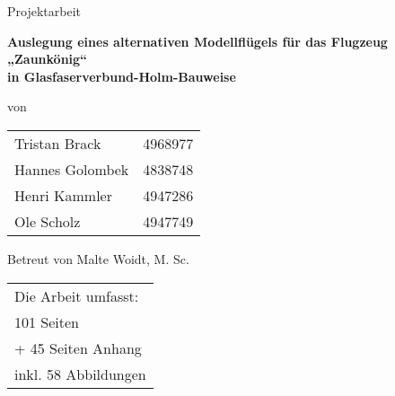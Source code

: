 
\begin{center}

	\par\bigskip
	\par\bigskip
	\par\bigskip
	\par\bigskip	
	\par\bigskip
	\par\bigskip	
	{Projektarbeit}\\
\begin{huge}	\par\bigskip
	\par\bigskip	
	\par\bigskip
	\par\bigskip	
	\textbf{Auslegung eines alternativen Modellflügels für das Flugzeug „Zaunkönig“} \\
	\textbf{in Glasfaserverbund-Holm-Bauweise}\\
	\par\bigskip
	\par\bigskip
	
	\end{huge}

	\par\bigskip
	
\par\bigskip
\par\bigskip	
	\par\bigskip
\par\bigskip
von	
\par\bigskip
\par\bigskip
\begin{tabular}{lr}
	Tristan Brack& 4968977\\
	Hannes Golombek & 4838748\\
	Henri Kammler & 4947286\\
	Ole Scholz & 4947749 \\
\end{tabular}
\par\bigskip
\par\bigskip	
\par\bigskip

Betreut von Malte Woidt, M. Sc.\\
\par\bigskip
\par\bigskip
\par\bigskip	
\par\bigskip
\par\bigskip	
\par\bigskip
\end{center}
\begin{tabular}{l}
	Die Arbeit umfasst:\\
	101 Seiten\\
	\:\:\:+ 45 Seiten Anhang\\
	inkl. 58 Abbildungen\\
\end{tabular}

